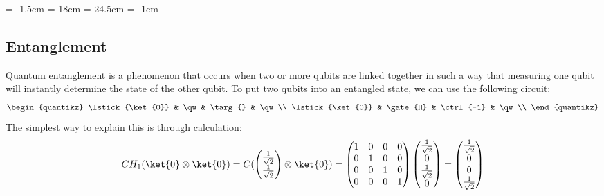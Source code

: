 \documentclass[a4paper, 11pt]{article}
\begin{document}
    \topmargin = -1.5cm
    \textwidth = 18cm
    \textheight = 24.5cm
    \oddsidemargin = -1cm

    \subsection{Entanglement} 
    Quantum entanglement is a phenomenon that occurs when two or more qubits are linked together in such a way that measuring one qubit will instantly determine the state of the other qubit.
    To put two qubits into an entangled state, we can use the following circuit:
    \[
        \begin{quantikz}
            \lstick{\ket{0}} & \qw & \targ{} & \qw\\
            \lstick{\ket{0}} & \gate{H} & \ctrl{-1} & \qw\\
        \end{quantikz}
    \]
    The simplest way to explain this is through calculation:
    \[
        C H_{1} (\ket{0} \otimes \ket{0}) =
        C (
        \begin{pmatrix}
            \frac{1}{\sqrt{2}} \\
            \frac{1}{\sqrt{2}} \\
        \end{pmatrix}
        \otimes
        \ket{0}
        ) = 
        \begin{pmatrix}
            1 & 0 & 0 & 0 \\
            0 & 1 & 0 & 0 \\
            0 & 0 & 1 & 0 \\
            0 & 0 & 0 & 1 \\
        \end{pmatrix}
        \begin{pmatrix}
            \frac{1}{\sqrt{2}} \\
            0 \\
            \frac{1}{\sqrt{2}} \\
            0 \\
        \end{pmatrix} =
        \begin{pmatrix}
            \frac{1}{\sqrt{2}} \\
            0 \\
            0 \\
            \frac{1}{\sqrt{2}} \\
        \end{pmatrix}
    \]
\end{document}
